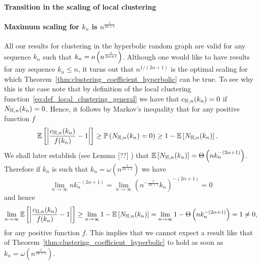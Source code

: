 
\paragraph{Transition in the scaling of local clustering}

\paragraph{Maximum scaling for $k_n$ is $n^{\frac{1}{2\alpha +1}}$}
All our results for clustering in the hyperbolic random graph are valid for any sequence $k_n$ such that $k_n = o\left(n^{\frac{1}{2\alpha + 1}}\right)$. Although one would like to have results for any sequence $k_n \le n$, it turns out that $n^{1/(2\alpha + 1)}$ is the optimal scaling for which Theorem~\ref{thm:clustering_coefficient_hyperbolic} can be true. To see why this is the case note that by definition of the local clustering function~\eqref{eq:def_local_clustering_general} we have that $c_{\mathbb{H},n}(k_n) = 0$ if $N_{\mathbb{H},n}(k_n) = 0$. Hence, it follows by Markov's inequality that for any positive function $f$
\begin{align*}
	\mathbb{E}\left[\left|\frac{c_{\mathbb{H},n}(k_n)}{f(k_n)} - 1\right|\right] 
	&\ge \mathbb{P}\left(N_{\mathbb{H},n}(k_n) = 0\right) \ge 1 - \mathbb{E}\left[N_{\mathbb{H},n}(k_n)\right].
\end{align*}
We shall later establish (see Lemma [??] ) that $\mathbb{E}\left[N_{\mathbb{H},n}(k_n)\right] = \Theta\left(n k_n^{-(2\alpha + 1)}\right)$. Therefore if $k_n$ is such that $k_n = \omega\left(n^{\frac{1}{2\alpha + 1}}\right)$ we have
\[
	\lim_{n \to \infty} n k_n^{-(2\alpha + 1)} 
	= \lim_{n \to \infty} \left(n^{-\frac{1}{2\alpha + 1}} k_n\right)^{-(2\alpha + 1)} = 0
\]
and hence
\[
	\lim_{n \to \infty} \mathbb{E}\left[\left|\frac{c_{\mathbb{H},n}(k_n)}{f(k_n)} - 1\right|\right] 
	\ge \lim_{n \to \infty} 1 - \mathbb{E}\left[N_{\mathbb{H},n}(k_n)\right] = \lim_{n \to \infty} 1 - \Theta\left(n k_n^{-(2\alpha + 1)}\right) = 1 \ne 0,
\]
for any positive function $f$. This implies that we cannot expect a result like that of Theorem~\ref{thm:clustering_coefficient_hyperbolic} to hold as soon as $k_n = \omega\left(n^{\frac{1}{2\alpha + 1}}\right)$.



